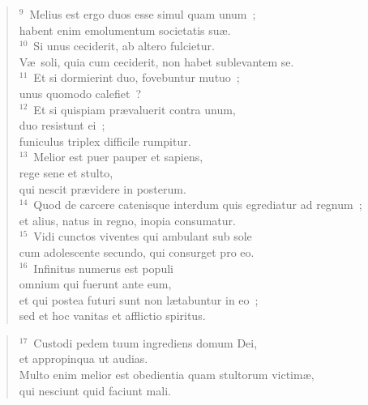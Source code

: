 \begin{flushleft}\begin{verse}${}^{9}$~Melius est ergo duos esse simul quam unum~;\\ habent enim emolumentum societatis su\ae .\\
${}^{10}$~Si unus ceciderit, ab altero fulcietur.\\ V\ae\ soli, quia cum ceciderit, non habet sublevantem se.\\
${}^{11}$~Et si dormierint duo, fovebuntur mutuo~;\\ unus quomodo calefiet~?\\
${}^{12}$~Et si quispiam pr\ae valuerit contra unum,\\ duo resistunt ei~;\\ funiculus triplex difficile rumpitur.\\
${}^{13}$~Melior est puer pauper et sapiens,\\ rege sene et stulto,\\ qui nescit pr\ae videre in posterum.\\
${}^{14}$~Quod de carcere catenisque interdum quis egrediatur ad regnum~;\\ et alius, natus in regno, inopia consumatur.\\
${}^{15}$~Vidi cunctos viventes qui ambulant sub sole\\ cum adolescente secundo, qui consurget pro eo.\\
${}^{16}$~Infinitus numerus est populi\\ omnium qui fuerunt ante eum,\\ et qui postea futuri sunt non l\ae tabuntur in eo~;\\ sed et hoc vanitas et afflictio spiritus.\end{verse}\end{flushleft}


\begin{flushleft}\begin{verse}${}^{17}$~Custodi pedem tuum ingrediens domum Dei,\\ et appropinqua ut audias.\\ Multo enim melior est obedientia quam stultorum victim\ae ,\\ qui nesciunt quid faciunt mali.\end{verse}\end{flushleft}


